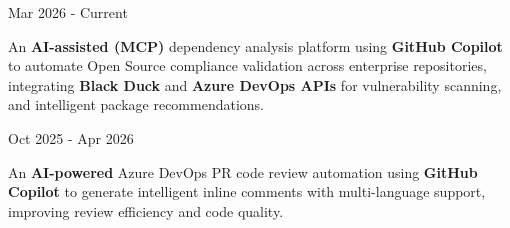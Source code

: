 

\begin{cventries}

  \cventry
    {} %
    {} %
    {} %
    {Mar 2026 - Current} %
    {
      \begin{cvitems} %
        \item {An \textbf{AI-assisted (MCP)} dependency analysis platform using \textbf{GitHub Copilot} to automate Open Source compliance validation across enterprise repositories, integrating \textbf{Black Duck} and \textbf{Azure DevOps APIs} for vulnerability scanning, and intelligent package recommendations.}
      \end{cvitems}
    }

  \cventry
    {} %
    {} %
    {} %
    {Oct 2025 - Apr 2026} %
    {
      \begin{cvitems} %
        \item {An \textbf{AI-powered} Azure DevOps PR code review automation using \textbf{GitHub Copilot} to generate intelligent inline comments with multi-language support, improving review efficiency and code quality.}
      \end{cvitems}
    }



\end{cventries}
